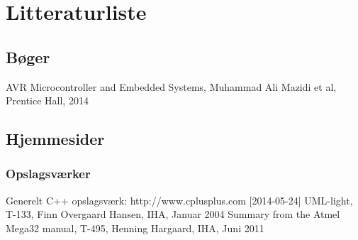 \chapter{Litteraturliste}

\section{Bøger}
AVR Microcontroller and Embedded Systems, Muhammad Ali Mazidi et al, Prentice Hall, 2014 \newline

\section{Hjemmesider}

\subsection{Opslagsværker}
Generelt C++ opslagsværk: http://www.cplusplus.com [2014-05-24] \newline
UML-light, T-133, Finn Overgaard Hansen, IHA, Januar 2004 \newline
Summary from the Atmel Mega32 manual, T-495, Henning Hargaard, IHA, Juni 2011 \newline
